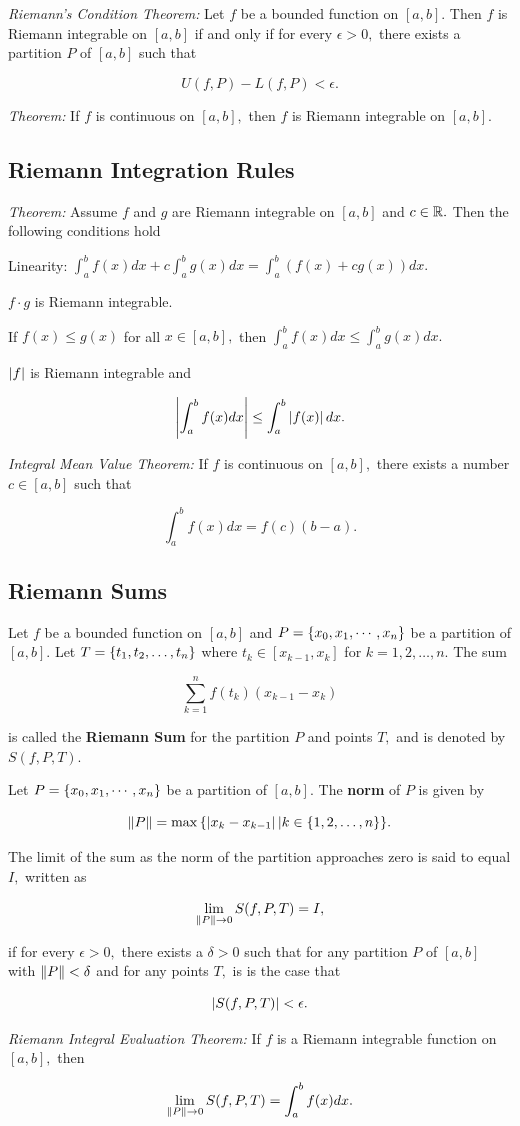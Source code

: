 \documentclass{article}
\begin{document}
\emph{Riemann's Condition Theorem:} Let $f$ be a bounded function on $[a,b].$ Then $f$ is Riemann integrable on $[a,b]$ if and only if for every $\epsilon > 0,$ there exists a partition $P$ of $[a,b]$ such that

\[ U(f, P) - L(f, P) < \epsilon. \]

\emph{Theorem:} If $f$ is \@{continuous} on $[a,b],$ then $f$ is Riemann integrable on $[a,b].$

\subsection{Riemann Integration Rules}

\emph{Theorem:} Assume $f$ and $g$ are Riemann integrable on $[a,b]$ and $c \in \mathbb{R}.$ Then the following conditions hold

Linearity: $\int_a^{b} f(x) dx + c \int_a^{b} g(x) dx = \int_a^{b}(f(x) + cg(x))dx. $

$f \cdot g$ is Riemann integrable.

If $f(x) \leq g(x)$ for all $x \in [a,b],$ then $\int_a^{b} f(x) dx \leq \int_a^{b} g(x) dx.$

$\left| f \right|$ is Riemann integrable and

\[ \left| \int_a^{b} f(x) dx \right| \leq \int_a^{b} \left| f(x) \right| dx. \]

\emph{Integral Mean Value Theorem:} If $f$ is \@{continuous} on $[a,b],$ there exists a number $c \in [a,b]$ such that

\[ \int_a^{b} f(x) dx = f(c)(b - a). \]

\subsection{Riemann Sums}

Let $f$ be a bounded function on $[a,b]$ and $P = \left\{ x_0, x_1, \cdots, x_n \right\}$ be a partition of $[a,b].$ Let $T = \left\{ t_1, t_2, \dots, t_n \right\}$ where $t_k \in [x_{k-1}, x_k]$ for $k = 1,2,\dots, n.$ The sum

\[ \sum_{k=1}^n f(t_k)(x_{k-1} - x_k) \]

is called the \textbf{Riemann Sum} for the partition $P$ and points $T,$ and is denoted by $S(f, P, T).$

Let $P = \left\{ x_0, x_1, \cdots, x_n \right\}$ be a partition of $[a,b].$ The \textbf{norm} of $P$ is given by

\[ \left\lVert P \right\rVert = \max{\left\{ \left| x_k - x_{k-1} \right| | k \in \left\{ 1,2,\dots,n \right\} \right\}}. \]

The limit of the sum as the norm of the partition approaches zero is said to equal $I,$ written as

\[ \lim_{\left\lVert P \right\rVert \to 0} S(f, P, T) = I, \]

if for every $\epsilon > 0,$ there exists a $\delta > 0$ such that for any partition $P$ of $[a,b]$ with $\left\lVert P \right\rVert < \delta$ and for any points $T,$ is is the case that

\[ \left| S(f, P, T) \right| <  \epsilon. \]

\emph{Riemann Integral Evaluation Theorem:} If $f$ is a Riemann integrable function on $[a,b],$ then

\[ \lim_{\left\lVert P \right\rVert \to 0} S(f, P, T) = \int_a^{b} f(x) dx. \]
\end{document}
